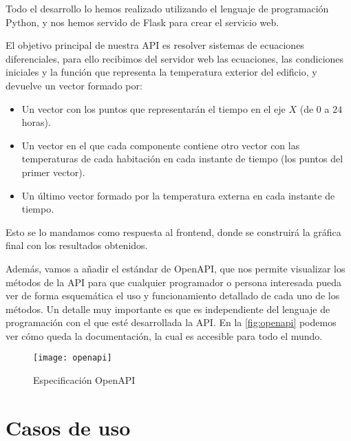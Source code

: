 Todo el desarrollo lo hemos realizado utilizando el lenguaje de programación Python, y nos hemos servido de Flask para crear el servicio web.

El objetivo principal de nuestra API es resolver sistemas de ecuaciones diferenciales, para ello recibimos del servidor web las ecuaciones, las condiciones iniciales y la función que representa la temperatura exterior del edificio, y devuelve un vector formado por:
\begin{itemize}
	\item Un vector con los puntos que representarán el tiempo en el eje $X$ (de $0$ a $24$ horas).
	\item Un vector en el que cada componente contiene otro vector con las temperaturas de cada habitación en cada instante de tiempo (los puntos del primer vector).
	\item Un último vector formado por la temperatura externa en cada instante de tiempo.
\end{itemize} 
Esto se lo mandamos como respuesta al frontend, donde se construirá la gráfica final con los resultados obtenidos.

Además, vamos a añadir el estándar de OpenAPI, que nos permite visualizar los métodos de la API para que cualquier programador o persona interesada pueda ver de forma esquemática el uso y funcionamiento detallado de cada uno de los métodos. Un detalle muy importante es que es independiente del lenguaje de programación con el que esté desarrollada la API. En la \autoref{fig:openapi} podemos ver cómo queda la documentación, la cual es accesible para todo el mundo.
\begin{figure}[h!]
	\centering
	\texttt{[image: openapi]}
	\caption{Especificación OpenAPI}
	\label{fig:openapi}
\end{figure}
\section{Casos de uso}
